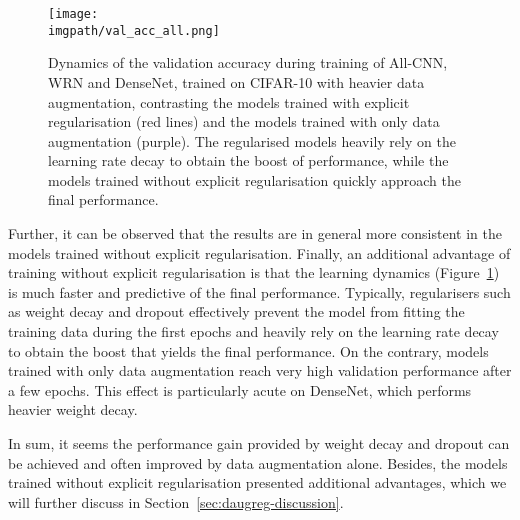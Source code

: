 {\begin{figure}[htb]
  \begin{center}
    \texttt{[image: \\imgpath/val\_acc\_all.png]}
  \end{center}
  \caption{Dynamics of the validation accuracy during training of All-CNN, WRN and DenseNet, trained on CIFAR-10 with heavier data augmentation, contrasting the models trained with explicit regularisation (red lines) and the models trained with only data augmentation (purple). The regularised models heavily rely on the learning rate decay to obtain the boost of performance, while the models trained without explicit regularisation quickly approach the final performance.}
  \label{fig:daugreg-dynamics}
\end{figure}

Further, it can be observed that the results are in general more consistent in the models trained without explicit regularisation. Finally, an additional advantage of training without explicit regularisation is that the learning dynamics (Figure~\ref{fig:daugreg-dynamics}) is much faster and predictive of the final performance. Typically, regularisers such as weight decay and dropout effectively prevent the model from fitting the training data during the first epochs and heavily rely on the learning rate decay to obtain the boost that yields the final performance. On the contrary, models trained with only data augmentation reach very high validation performance after a few epochs. This effect is particularly acute on DenseNet, which performs heavier weight decay.

In sum, it seems the performance gain provided by weight decay and dropout can be achieved and often improved by data augmentation alone. Besides, the models trained without explicit regularisation presented additional advantages, which we will further discuss in Section~\ref{sec:daugreg-discussion}.

}
